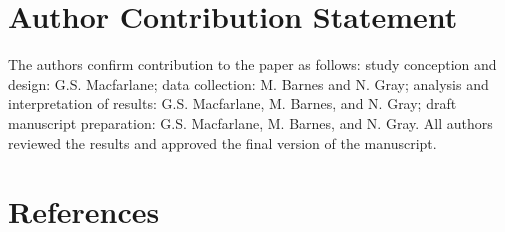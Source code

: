 \documentclass[
  letterpaper,
]{trb}
\begin{document}

\hypertarget{author-contribution-statement}{%
\section*{Author Contribution
Statement}\label{author-contribution-statement}}


The authors confirm contribution to the paper as follows: study
conception and design: G.S. Macfarlane; data collection: M. Barnes and
N. Gray; analysis and interpretation of results: G.S. Macfarlane, M.
Barnes, and N. Gray; draft manuscript preparation: G.S. Macfarlane, M.
Barnes, and N. Gray. All authors reviewed the results and approved the
final version of the manuscript.


\hypertarget{references}{%
\section*{References}\label{references}}

\end{document}
